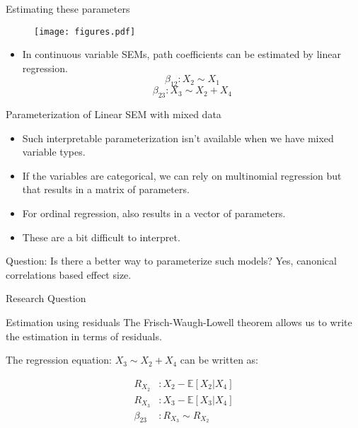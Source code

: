 \documentclass{beamer}
\begin{document}
\begin{frame}{Estimating these parameters}
	\begin{figure}
		\centering
		\texttt{[image: figures.pdf]}
	\end{figure}
	\begin{itemize}
		\item In continuous variable SEMs, path coefficients can be estimated by linear regression.
			$$ \beta_{12}: X_2 \sim X_1 $$
			$$ \beta_{23}: X_3 \sim X_2 + X_4 $$
	\end{itemize}
\end{frame}

\begin{frame}{Parameterization of Linear SEM with mixed data}
	\begin{itemize}
		\item Such interpretable parameterization isn't available when we have mixed variable types.
		\item If the variables are categorical, we can rely on multinomial regression but that results
			in a matrix of parameters.
		\item For ordinal regression, also results in a vector of parameters.
		\item These are a bit difficult to interpret.
	\end{itemize}

	Question: Is there a better way to parameterize such models? Yes, canonical correlations based effect size.
\end{frame}

\begin{frame}{Research Question}
\end{frame}


\begin{frame}{Estimation using residuals}
	The Frisch-Waugh-Lowell theorem allows us to write the estimation in
	terms of residuals. 

	The regression equation: $ X_3 \sim X_2 + X_4 $ can
	be written as:

	\begin{equation*}
		\begin{split}
			R_{X_2}&: X_2 - \mathbb{E}[X_2 | X_4] \\
			R_{X_3}&: X_3 - \mathbb{E}[X_3 | X_4] \\
			\beta_{23}&: R_{X_3} \sim R_{X_2} \\
		\end{split}
	\end{equation*}
\end{frame}
\end{document}

